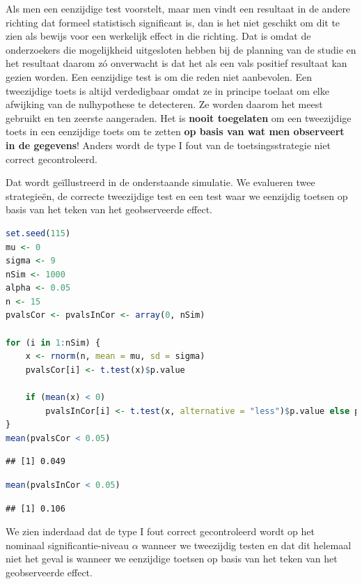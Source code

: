 \documentclass[
  12pt,dutch,coursenotes]{book}
\begin{document}
Als men een eenzijdige test voorstelt, maar men
vindt een resultaat in de andere richting
dat formeel statistisch significant is, dan is het niet geschikt om dit te
zien als bewijs voor een werkelijk effect in die richting. Dat is omdat de
onderzoekers die mogelijkheid uitgesloten hebben bij de planning van de
studie en het resultaat daarom zó onverwacht is dat het als een vals
positief resultaat kan gezien worden. Een eenzijdige test is om die reden
niet aanbevolen. Een tweezijdige toets is altijd verdedigbaar omdat ze in principe toelaat om elke afwijking van de nulhypothese te detecteren. Ze worden daarom het meest gebruikt en ten zeerste aangeraden.
Het is \textbf{nooit toegelaten} om een tweezijdige toets in een eenzijdige
toets om te zetten \textbf{op basis van wat men observeert in de gegevens}!
Anders wordt de type I fout van de toetsingsstrategie niet correct gecontroleerd.

Dat wordt geïllustreerd in de onderstaande simulatie.
We evalueren twee strategieën, de correcte tweezijdige test en een test waar we eenzijdig toetsen op basis van het teken van het geobserveerde effect.

\begin{lstlisting}[language=R]
set.seed(115)
mu <- 0
sigma <- 9
nSim <- 1000
alpha <- 0.05
n <- 15
pvalsCor <- pvalsInCor <- array(0, nSim)

for (i in 1:nSim) {
    x <- rnorm(n, mean = mu, sd = sigma)
    pvalsCor[i] <- t.test(x)$p.value

    if (mean(x) < 0)
        pvalsInCor[i] <- t.test(x, alternative = "less")$p.value else pvalsInCor[i] <- t.test(x, alternative = "greater")$p.value
}
mean(pvalsCor < 0.05)
\end{lstlisting}

\begin{lstlisting}
## [1] 0.049
\end{lstlisting}

\begin{lstlisting}[language=R]
mean(pvalsInCor < 0.05)
\end{lstlisting}

\begin{lstlisting}
## [1] 0.106
\end{lstlisting}

We zien inderdaad dat de type I fout correct gecontroleerd wordt op het nominaal significantie-niveau \(\alpha\) wanneer we tweezijdig testen en dat dit helemaal niet het geval is wanneer we eenzijdige toetsen op basis van het teken van het geobserveerde effect.
\end{document}
